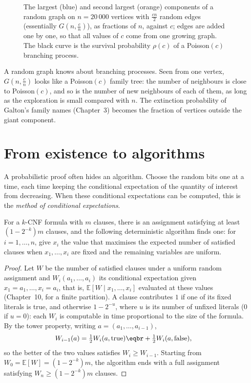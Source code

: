 \begin{figure}[ht]
\centering
{}
\caption{The largest (blue) and second largest (orange) components of a random graph on $n=20\,000$ vertices with $\frac{cn}2$ random edges (essentially
$G(n,\frac cn)$), as fractions of $n$, against $c$; edges are added one by one, so that all values of $c$ come from one growing graph.
The black curve is the survival probability $\rho(c)$ of a Poisson$(c)$ branching process.}
\label{fig:giant}
\end{figure}

\begin{beauty}
A random graph knows about branching processes. Seen from one vertex, $G(n,\frac cn)$ looks like a Poisson$(c)$ family tree: the number
of neighbours is close to Poisson$(c)$, and so is the number of new neighbours of each of them, as long as the exploration is
small compared with $n$. The extinction probability of Galton's family names (Chapter~3) becomes the fraction of
vertices outside the giant component.
\end{beauty}

\section{From existence to algorithms}

A probabilistic proof often hides an algorithm. Choose the random bits one at a time, each time keeping the
conditional expectation of the quantity of interest from decreasing. When these conditional expectations can be
computed, this is the \emph{method of conditional expectations}.

\begin{theorem}\label{thm:maxsat}
For a $k$-CNF formula with $m$ clauses, there is an assignment satisfying at least $(1-2^{-k})m$ clauses, and the following deterministic
algorithm finds one: for $i=1,\dots,n$, give $x_i$ the value that maximises the expected number of satisfied clauses when $x_1,\dots,x_i$ are fixed
and the remaining variables are uniform.
\end{theorem}
\begin{proof}
Let $W$ be the number of satisfied clauses under a uniform random assignment and $W_i(a_1,\dots,a_i)$ its conditional expectation given
$x_1=a_1,\dots,x_i=a_i$, that is, $\mathbb E[W\mid x_1,\dots,x_i]$ evaluated at these values (Chapter~10, for a finite partition). A clause contributes $1$ if one of its fixed
literals is true, and otherwise $1-2^{-u}$, where $u$ is its number of unfixed literals ($0$ if $u=0$): each $W_i$ is computable in time proportional
to the size of the formula. By the tower property, writing $a=(a_1,\dots,a_{i-1})$,
\[
\begin{aligned}W_{i-1}(a)&=\tfrac12W_i(a,\text{true})\eqbr+\tfrac12W_i(a,\text{false}),\end{aligned}
\]
so the better of the two values satisfies $W_i\ge W_{i-1}$. Starting from $W_0=\mathbb E[W]=(1-2^{-k})m$, the algorithm ends with a full assignment satisfying
$W_n\ge(1-2^{-k})m$ clauses.
\end{proof}

